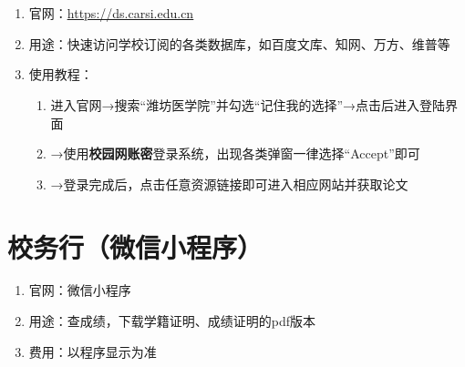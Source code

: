 \section[CARSI系统]{\textbf{}}
\label{carsi_system}
\begin{enumerate}
      \item 官网：\uline{\href{https://ds.carsi.edu.cn}{https://ds.carsi.edu.cn}}
      \item 用途：快速访问学校订阅的各类数据库，如百度文库、知网、万方、维普等
      \item 使用教程：
            \begin{enumerate}
                  \item 进入官网→搜索“潍坊医学院”并勾选“记住我的选择”→点击后进入登陆界面\footnotemark
                  \item →使用\textbf{校园网账密}登录系统，出现各类弹窗一律选择“Accept”即可\footnotemark
                  \item →登录完成后，点击任意资源链接即可进入相应网站并获取论文
            \end{enumerate}
\end{enumerate}

\section[校务行（微信小程序）]{校务行（微信小程序）}
\begin{enumerate}
      \item 官网：微信小程序
      \item 用途：查成绩，下载学籍证明、成绩证明的pdf版本
      \item 费用：以程序显示为准
\end{enumerate}

